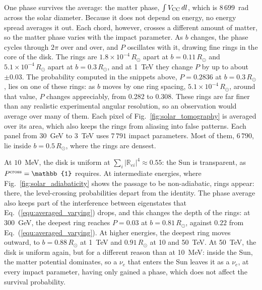 \documentclass[final,5p,times,twocolumn,sort,compress]{elsarticle}
\makeatletter
\newcommand{\eq}{Eq.}
\newcommand{\fig}{Fig.}
\DeclareRobustCommand{\_}{%
  \ifmmode\nfss@text{\textunderscore}\else\textunderscore\allowbreak\fi}
\newcommand{\equ}[1]{\eq~(\ref{equ:#1})}
\newcommand{\figu}[1]{\fig~\ref{fig:#1}}
\makeatother
\begin{document}
One phase survives the average: the matter phase, $\int V_{\rm CC}\,dl$, which is $8\,699$~rad across the solar diameter. Because it does not depend on energy, no energy spread averages it out. Each chord, however, crosses a different amount of matter, so the matter phase varies with the impact parameter. As $b$ changes, the phase cycles through $2\pi$ over and over, and $P$ oscillates with it, drawing fine rings in the core of the disk. The rings are $1.8\times10^{-4}\,R_\odot$ apart at $b = 0.11\,R_\odot$ and $5.1\times10^{-4}\,R_\odot$ apart at $b = 0.3\,R_\odot$, and at 1~TeV they change $P$ by up to about $\pm 0.03$. The probability computed in the snippets above, $P = 0.2836$ at $b = 0.3\,R_\odot$, lies on one of these rings: as $b$ moves by one ring spacing, $5.1\times10^{-4}\,R_\odot$, around that value, $P$ changes appreciably, from 0.282 to 0.308. These rings are far finer than any realistic experimental angular resolution, so an observation would average over many of them. Each pixel of \figu{solar_tomography} is averaged over its area, which also keeps the rings from aliasing into false patterns. Each panel from 30~GeV to 3~TeV uses $7\,791$ impact parameters. Most of them, $6\,790$, lie inside $b = 0.5\,R_\odot$, where the rings are densest.

At $10$~MeV, the disk is uniform at $\sum_i \lvert \mathbb{R}_{ei} \rvert^4 \approx 0.55$: the Sun is transparent, as $P^{\rm cross} = \mathbb{1}$ requires. At intermediate energies, where \figu{solar_adiabaticity} shows the passage to be non-adiabatic, rings appear: there, the level-crossing probabilities depart from the identity. The phase average also keeps part of the interference between eigenstates that \equ{averaged_varying} drops, and this changes the depth of the rings: at 300~GeV, the deepest ring reaches $P = 0.03$ at $b = 0.81\,R_\odot$, against $0.22$ from \equ{averaged_varying}. At higher energies, the deepest ring moves outward, to $b = 0.88\,R_\odot$ at 1~TeV and $0.91\,R_\odot$ at 10 and 50~TeV. At 50~TeV, the disk is uniform again, but for a different reason than at 10~MeV: inside the Sun, the matter potential dominates, so a $\nu_e$ that enters the Sun leaves it as a $\nu_e$, at every impact parameter, having only gained a phase, which does not affect the survival probability.
\end{document}
